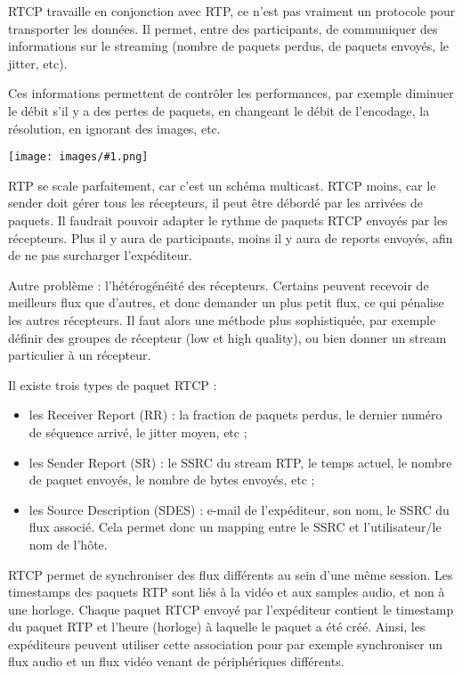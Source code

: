 \documentclass[10pt,a4paper]{report}
\newcommand{\dessinS}[2]{\begin{center}\texttt{[image: images/\#1.png]}\end{center}}
\begin{document}
		RTCP travaille en conjonction avec RTP, ce n'est pas vraiment un protocole pour transporter les données. Il permet, entre des participants, de communiquer des informations sur le streaming (nombre de paquets perdus, de paquets envoyés, le jitter, etc).
		
		Ces informations permettent de contrôler les performances, par exemple diminuer le débit s'il y a des pertes de paquets, en changeant le débit de l'encodage, la résolution, en ignorant des images, etc.
		
		\dessinS{88}{.85}
		
		RTP se scale parfaitement, car c'est un schéma multicast. RTCP moins, car le sender doit gérer tous les récepteurs, il peut être débordé par les arrivées de paquets. Il faudrait pouvoir adapter le rythme de paquets RTCP envoyés par les récepteurs. Plus il y aura de participants, moins il y aura de reports envoyés, afin de ne pas surcharger l'expéditeur.
		
		Autre problème : l'hétérogénéité des récepteurs. Certains peuvent recevoir de meilleurs flux que d'autres, et donc demander un plus petit flux, ce qui pénalise les autres récepteurs. Il faut alors une méthode plus sophistiquée, par exemple définir des groupes de récepteur (low et high quality), ou bien donner un stream particulier à un récepteur.
		
		
		Il existe trois types de paquet RTCP :
		
		\begin{itemize}
			\item les Receiver Report (RR) : la fraction de paquets perdus, le dernier numéro de séquence arrivé, le jitter moyen, etc ;
			\item les Sender Report (SR) : le SSRC du stream RTP, le temps actuel, le nombre de paquet envoyés, le nombre de bytes envoyés, etc ;
			\item les Source Description (SDES) : e-mail de l'expéditeur, son nom, le SSRC du flux associé. Cela permet donc un mapping entre le SSRC et l'utilisateur/le nom de l'hôte.
		\end{itemize}
		
		RTCP permet de synchroniser des flux différents au sein d'une même session. Les timestamps des paquets RTP sont liés à la vidéo et aux samples audio, et non à une horloge. Chaque paquet RTCP envoyé par l'expéditeur contient le timestamp du paquet RTP et l'heure (horloge) à laquelle le paquet a été créé. Ainsi, les expéditeurs peuvent utiliser cette association pour par exemple synchroniser un flux audio et un flux vidéo venant de périphériques différents.
		
\end{document}
